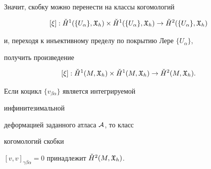 Значит, скобку можно перенести на классы когомологий


$$


[\xi] : \Check H^1(\{U_{\alpha}\}, {\frak X}_{h})


\times \Check H^1


(\{U_{\alpha}\}, {\frak X}_{h}) \to \Check H^2


(\{U_{\alpha}\}, {\frak X}_{h})


$$


и, переходя к инъективному пределу по покрытию Лере $\{U_{\alpha}\}$,


получить произведение


$$


[\xi] : \Check H^1(M, {\frak X}_{h}) \times \Check H^1


(M, {\frak X}_{h}) \to \Check H^2


(M, {\frak X}_{h}).


$$





\begin{assrt}


Если коцикл $\{v_{\beta \alpha} \}$ является интегрируемой


инфинитезимальной 


деформацией заданного атласа ${\cal A}$, то класс


когомологий скобки


$[v, v]_{\gamma \beta \alpha}=0$ принадлежит $\Check H^2(M,{\frak X}_h)$.


\end{assrt}





